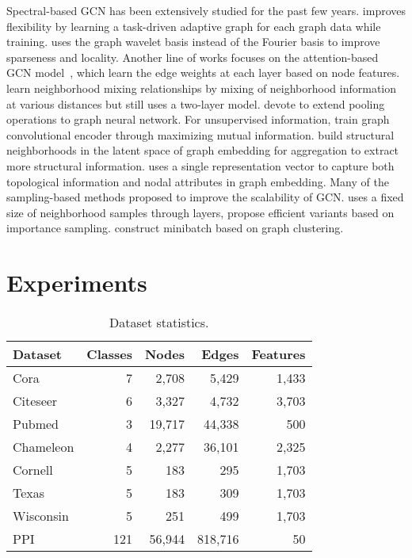 \documentclass{article}
\begin{document}
Spectral-based GCN has been extensively studied for the past few years. \cite{DBLP:conf/aaai/LiWZH18} improves flexibility by learning a task-driven adaptive graph for each graph data while training. \cite{xu2018graph} uses the graph wavelet basis instead of the Fourier basis to improve sparseness and locality. Another line of works focuses on the attention-based GCN model~\cite{velickovic2018graph,180303735,DBLP:conf/uai/ZhangSXMKY18}, which learn the edge weights at each layer based on node features. \cite{DBLP:conf/icml/Abu-El-HaijaPKA19} learn neighborhood mixing relationships by mixing of neighborhood information at various distances but still uses a two-layer model. \cite{DBLP:conf/icml/GaoJ19,DBLP:conf/icml/LeeLK19} devote to extend pooling operations to graph neural network. For unsupervised information, \cite{DBLP:conf/iclr/VelickovicFHLBH19} train graph convolutional encoder through maximizing mutual information. \cite{Pei2020GeomGCN} build structural neighborhoods in the latent space of graph embedding for aggregation to extract more structural information. \cite{DBLP:journals/dase/DaveZCH19} uses a single representation vector to capture both topological information and nodal attributes in graph embedding. Many of the sampling-based methods proposed to improve the scalability of GCN. \cite{hamilton2017inductive} uses a fixed size of neighborhood samples through layers, \cite{DBLP:conf/iclr/ChenMX18,DBLP:conf/nips/Huang0RH18} propose efficient variants based on importance sampling. \cite{DBLP:conf/kdd/ChiangLSLBH19} construct minibatch based on graph clustering.
 \section{Experiments}
\label{sec:exp}
\begin{table}[t]
    \caption{Dataset statistics.}
    \label{dataset-table}
    \vskip 0.10in

    \begin{tabular}{lrrrr}
    \toprule
    Dataset & Classes & Nodes & Edges & Features \\
    \midrule
    Cora        & 7   &  2,708 &   5,429 & 1,433 \\
    Citeseer    & 6   &  3,327 &   4,732 & 3,703 \\
    Pubmed      & 3   & 19,717 &  44,338 & 500 \\
    Chameleon   & 4   &  2,277 &  36,101 & 2,325 \\
    Cornell     & 5   &    183 &    295  & 1,703 \\
    Texas       & 5   &    183 &    309  & 1,703 \\
    Wisconsin   & 5   &    251 &    499  & 1,703 \\
    PPI         & 121 & 56,944 & 818,716 & 50 \\
    \bottomrule
    \end{tabular}

\end{table}
\end{document}
